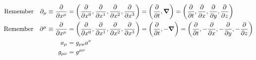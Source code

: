 \documentclass{article}
\begin{document}
\begin{align*}
  \qq*{Remember}\partial_\mu\equiv\pdv{x^\mu} & =\pqty{\pdv{x^0},\pdv{x^1},\pdv{x^2},\pdv{x^3}}=\pqty{\pdv{t},\grad}=\pqty{\pdv{t},\pdv{x},\pdv{y},\pdv{z}}     \\
  \qq*{Remember}\partial^\mu\equiv\pdv{x^\mu} & =\pqty{\pdv{x^0},\pdv{x^1},\pdv{x^2},\pdv{x^3}}=\pqty{\pdv{t},-\grad}=\pqty{\pdv{t},-\pdv{x},-\pdv{y},-\pdv{z}} \\
  a_\mu                                       & =g_{\mu\nu}a^\nu                                                                                                \\
  g_{\mu\nu}                                  & =g^{\mu\nu}                                                                                                     \\
\end{align*}
\end{document}
